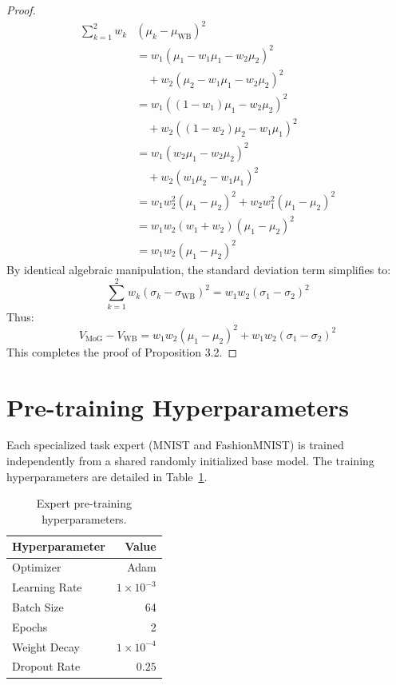 \documentclass{article}
\theoremstyle{plain}
\theoremstyle{definition}
\theoremstyle{remark}
\begin{document}
\begin{proof}
\begin{align}
  \sum_{k=1}^2 w_k &(\mu_k - \mu_{\text{WB}})^2 \nonumber \\
  &= w_1 \left( \mu_1 - w_1 \mu_1 - w_2 \mu_2 \right)^2 \nonumber \\
  &\quad+ w_2 \left( \mu_2 - w_1 \mu_1 - w_2 \mu_2 \right)^2 \\
  &= w_1 \left( (1 - w_1) \mu_1 - w_2 \mu_2 \right)^2 \nonumber \\
  &\quad+ w_2 \left( (1 - w_2) \mu_2 - w_1 \mu_1 \right)^2 \\
  &= w_1 \left( w_2 \mu_1 - w_2 \mu_2 \right)^2 \nonumber \\
  &\quad+ w_2 \left( w_1 \mu_2 - w_1 \mu_1 \right)^2 \\
  &= w_1 w_2^2 (\mu_1 - \mu_2)^2 + w_2 w_1^2 (\mu_1 - \mu_2)^2 \\
  &= w_1 w_2 (w_1 + w_2) (\mu_1 - \mu_2)^2 \\
  &= w_1 w_2 (\mu_1 - \mu_2)^2
\end{align}
By identical algebraic manipulation, the standard deviation term simplifies to:
\begin{equation}
  \sum_{k=1}^2 w_k (\sigma_k - \sigma_{\text{WB}})^2 = w_1 w_2 (\sigma_1 - \sigma_2)^2
\end{equation}
Thus:
\begin{equation}
  V_{\text{MoG}} - V_{\text{WB}} = w_1 w_2 (\mu_1 - \mu_2)^2 + w_1 w_2 (\sigma_1 - \sigma_2)^2
\end{equation}
This completes the proof of Proposition 3.2.
\end{proof}

\section{Pre-training Hyperparameters}
Each specialized task expert (MNIST and FashionMNIST) is trained independently from a shared randomly initialized base model. The training hyperparameters are detailed in Table~\ref{tab:train_hyper}.
\begin{table}[H]
  \caption{Expert pre-training hyperparameters.}
  \label{tab:train_hyper}
  \vskip 0.1in
  \begin{center}
    \begin{small}
      \begin{tabular}{l|r}
        \toprule
        Hyperparameter & Value \\
        \midrule
        Optimizer & Adam \\
        Learning Rate & $1 \times 10^{-3}$ \\
        Batch Size & 64 \\
        Epochs & 2 \\
        Weight Decay & $1 \times 10^{-4}$ \\
        Dropout Rate & $0.25$ \\
        \bottomrule
      \end{tabular}
    \end{small}
  \end{center}
\end{table}
\end{document}
